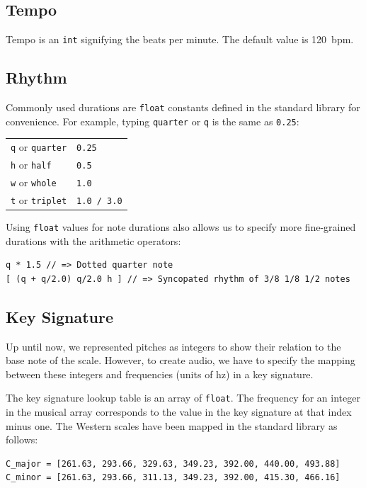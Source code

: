 \documentclass[11pt, onecolumn, letterpaper]{article}
\begin{document}
\subsection{Tempo}
Tempo is an \texttt{int} signifying the beats per minute. The default value is 120~bpm.

\subsection {Rhythm}
Commonly used durations are \texttt{float} constants defined in the standard library for convenience. For example, typing \texttt{quarter} or \texttt{q} is the same as \texttt{0.25}:

\begin{tabular}{ l l }
  \texttt{q} or \texttt{quarter} & \texttt{0.25} \\
  \texttt{h} or \texttt{half} & \texttt{0.5} \\
  \texttt{w} or \texttt{whole} & \texttt{1.0} \\
  \texttt{t} or \texttt{triplet} & \texttt{1.0 / 3.0} \\
\end{tabular}

Using \texttt{float} values for note durations also allows us to specify more fine-grained durations with the arithmetic operators:

\begin{lstlisting}
q * 1.5 // => Dotted quarter note
[ (q + q/2.0) q/2.0 h ] // => Syncopated rhythm of 3/8 1/8 1/2 notes
\end{lstlisting}

\subsection{Key Signature}
Up until now, we represented pitches as integers to show their relation to the base note of the scale. However, to create audio, we have to specify the mapping between these integers and frequencies (units of hz) in a key signature.

The key signature lookup table is an array of \texttt{float}. The frequency for an integer in the musical array corresponds to the value in the key signature at that index minus one. The Western scales have been mapped in the standard library as follows:

\begin{lstlisting}
C_major = [261.63, 293.66, 329.63, 349.23, 392.00, 440.00, 493.88]
C_minor = [261.63, 293.66, 311.13, 349.23, 392.00, 415.30, 466.16]
\end{lstlisting}
\end{document}
